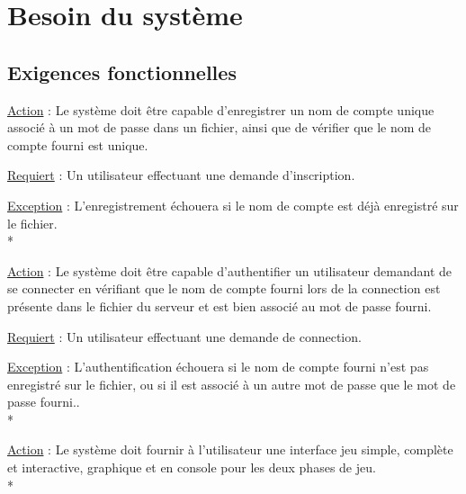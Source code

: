 \documentclass[a4paper]{article}
\begin{document}
\section{Besoin du système}
	\subsection{Exigences fonctionnelles}
		\begin{description}[style=nextline]
			\item[Enregistrer :]
			\begin{description}[leftmargin=*] %
				\item[]
				\item \underline{Action} : Le système doit être capable d'enregistrer un nom de compte unique associé à un mot de passe dans un fichier, ainsi que de vérifier que le nom de compte fourni est unique.
				\item \underline{Requiert} : Un utilisateur effectuant une demande d'inscription.
				\item \underline{Exception} : L'enregistrement échouera si le nom de compte est déjà enregistré sur le fichier.\\*
			\end{description} %
			
			\item[Authentifier :]
			\begin{description}[leftmargin=*] %
				\item[]
				\item \underline{Action} : Le système doit être capable d'authentifier un utilisateur demandant de se connecter en vérifiant que le nom de compte fourni lors de la connection est présente dans le fichier du serveur et est bien associé au mot de passe fourni.
				\item \underline{Requiert} : Un utilisateur effectuant une demande de connection.
				\item \underline{Exception} : L'authentification échouera si le nom de compte fourni n'est pas enregistré sur le fichier, ou si il est associé à un autre mot de passe que le mot de passe fourni..\\*
			\end{description} %
			
			\item[Fournir une interface :]
			\begin{description}[leftmargin=*] %
				\item[]
				\item \underline{Action} : Le système doit fournir à l'utilisateur une interface jeu simple, complète et interactive, graphique et en console pour les deux phases de jeu.\\*
			\end{description} %
			

\end{description}
\end{document}
